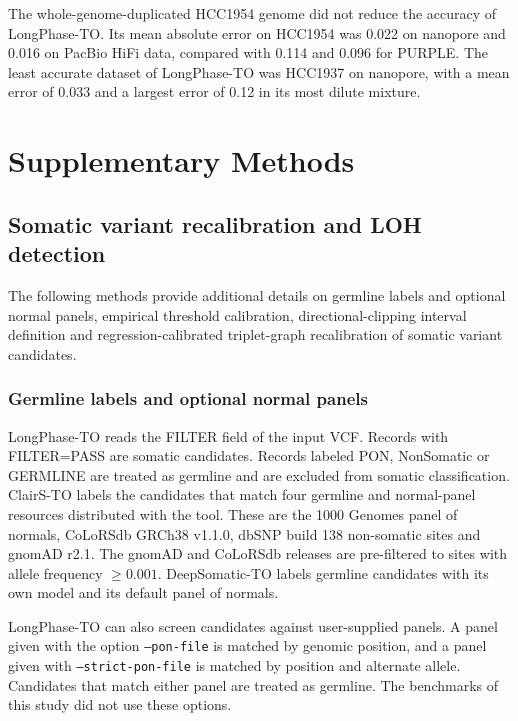 \documentclass[pdflatex,sn-nature]{sn-jnl}
\begin{document}
The whole-genome-duplicated HCC1954 genome did not reduce the accuracy of LongPhase-TO. Its mean absolute error on HCC1954 was 0.022 on nanopore and 0.016 on PacBio HiFi data, compared with 0.114 and 0.096 for PURPLE. The least accurate dataset of LongPhase-TO was HCC1937 on nanopore, with a mean error of 0.033 and a largest error of 0.12 in its most dilute mixture.

\section{Supplementary Methods}

\subsection{Somatic variant recalibration and LOH detection}\label{supplementary-methods-for-somatic-variant-analysis}

The following methods provide additional details on germline labels and optional normal panels, empirical threshold calibration, directional-clipping interval definition and regression-calibrated triplet-graph recalibration of somatic variant candidates.

\subsubsection{Germline labels and optional normal panels}\label{supp:pon-panels}

LongPhase-TO reads the FILTER field of the input VCF. Records with FILTER=PASS are somatic candidates. Records labeled PON, NonSomatic or GERMLINE are treated as germline and are excluded from somatic classification. ClairS-TO labels the candidates that match four germline and normal-panel resources distributed with the tool. These are the 1000 Genomes panel of normals, CoLoRSdb GRCh38 v1.1.0, dbSNP build 138 non-somatic sites and gnomAD r2.1. The gnomAD and CoLoRSdb releases are pre-filtered to sites with allele frequency $\ge 0.001$. DeepSomatic-TO labels germline candidates with its own model and its default panel of normals.

LongPhase-TO can also screen candidates against user-supplied panels. A panel given with the option \texttt{--pon-file} is matched by genomic position, and a panel given with \texttt{--strict-pon-file} is matched by position and alternate allele. Candidates that match either panel are treated as germline. The benchmarks of this study did not use these options.
\end{document}
